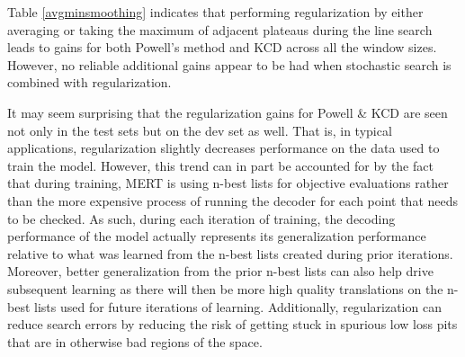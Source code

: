 \documentclass[11pt,tightenlines,kern-1pt]{article}
\begin{document}
Table \ref{avgminsmoothing} indicates that performing regularization by either averaging or taking the maximum of adjacent plateaus during the line search leads to gains for both Powell's method and KCD across all the window sizes. However, no reliable additional gains appear to be had when stochastic search is combined with regularization.

It may seem surprising that the regularization gains for Powell \& KCD are seen not only in the test sets but on the dev set as well. That is, in typical applications, regularization slightly decreases performance on the data used to train the model. However, this trend can in part be accounted for by the fact that during training, MERT is using n-best lists for objective evaluations rather than the more expensive process of running the decoder for each point that needs to be checked. As such, during each iteration of training, the decoding performance of the model actually represents its generalization performance relative to what was learned from the n-best lists created during prior iterations. Moreover, better generalization from the prior n-best lists can also help drive subsequent learning as there will then be more high quality translations on the n-best lists used for future iterations of learning. Additionally, regularization can reduce search errors by reducing the risk of getting stuck in spurious low loss pits that are in otherwise bad regions of the space.

\end{document}
